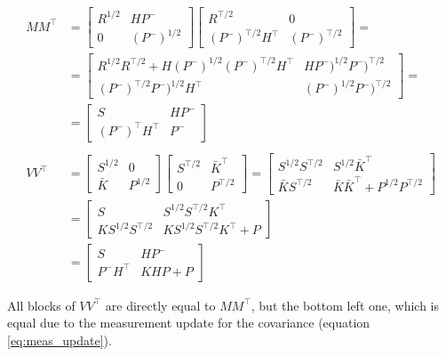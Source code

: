 \documentclass{article}
\begin{document}
\begin{equation}
\begin{split}
    MM^\top &= \begin{bmatrix} R^{1/2} & HP^- \\ 0 & (P^-)^{1/2} \end{bmatrix}\begin{bmatrix} R^{\top/2} & 0 \\ (P^-)^{\top/2}H^\top & (P^-)^{\top/2} \end{bmatrix}= \\
    &=\begin{bmatrix} R^{1/2}R^{\top/2} + H(P^-)^{1/2}(P^-)^{\top/2}H^\top & HP^-)^{1/2}P^-)^{\top/2} \\ (P^-)^{\top/2}P^-)^{1/2}H^\top & (P^-)^{1/2}P^-)^{\top/2} \end{bmatrix} = \\
    &=\begin{bmatrix}S & HP^- \\ (P^-)^\top H^\top & P^- \end{bmatrix} \\
    \\
    VV^\top & = \begin{bmatrix} S^{1/2} & 0 \\ \bar{K} & P^{1/2} \end{bmatrix}\begin{bmatrix} S^{\top/2} & \bar{K}^\top \\ 0 & P^{\top/2} \end{bmatrix} = \begin{bmatrix} S^{1/2}S^{\top/2} & S^{1/2}\bar{K}^\top \\ \bar{K}S^{\top/2} & \bar{K}\bar{K}^\top + P^{1/2}P^{\top/2} \end{bmatrix}\\
     & = \begin{bmatrix} S & S^{1/2}S^{\top/2}K^\top \\ KS^{1/2}S^{\top/2} & KS^{1/2}S^{\top/2}K^\top + P\end{bmatrix} \\
     & = \begin{bmatrix} S & HP^- \\ P^-H^\top & KHP + P\end{bmatrix}
\end{split}\label{eq:deriv_meas_update_sr}
\end{equation}

All blocks of $VV^\top$ are directly equal to $MM^\top$, but the bottom left one, which is equal due to the measurement update for the covariance (equation \ref{eq:meas_update}).
\end{document}
